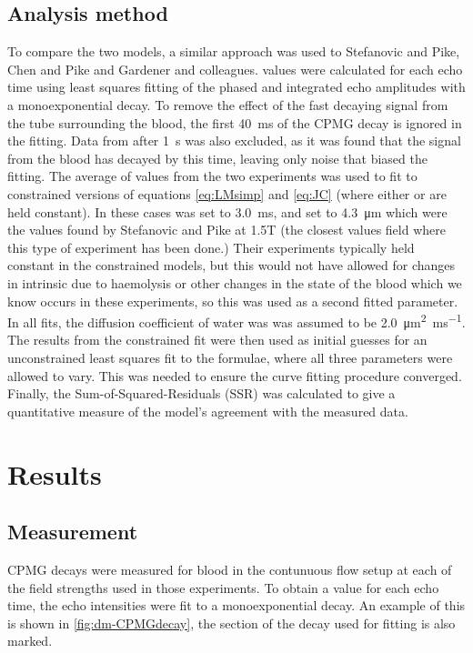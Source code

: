\subsection*{Analysis method}
To compare the two models, a similar approach was used to Stefanovic and Pike\cite{StefanovicHumanwholebloodrelaxometry2004}, Chen and Pike \cite{ChenHumanwholeblood2009} and Gardener and colleagues\cite{GardenerDependencebloodR22010}.
\Ttwo values were calculated for each echo time using least squares fitting of the phased and integrated echo amplitudes with a monoexponential decay.
To remove the effect of the fast decaying signal from the tube surrounding the blood, the first \SI{40}{ms} of the CPMG decay is ignored in the fitting.
Data from after \SI{1}{\second} was also excluded, as it was found that the signal from the blood has decayed by this time, leaving only noise that biased the fitting.
The average of \Ttwo values from the two experiments was used to fit to constrained versions of equations \ref{eq:LMsimp} and \ref{eq:JC} (where either \Texc or \rc are held constant).
In these cases \Texc was set to \SI{3.0}{ms}, and \rc set to \SI{4.3}{\micro\metre} which were the values found by Stefanovic and Pike at 1.5T\cite{StefanovicHumanwholebloodrelaxometry2004} (the closest values field where this type of experiment has been done.)
Their experiments typically held \TtwoO constant in the constrained models, but this would not have allowed for changes in intrinsic \Ttwo due to haemolysis or other changes in the state of the blood which we know occurs in these experiments, so this was used as a second fitted parameter.
In all fits, the diffusion coefficient of water was was assumed to be \SI[per-mode=reciprocal]{2.0}{\micro\metre\squared\per\milli\second}.
The results from the constrained fit were then used as initial guesses for an unconstrained least squares fit to the formulae, where all three parameters were allowed to vary.
This was needed to ensure the curve fitting procedure converged.
Finally, the Sum-of-Squared-Residuals (SSR) was calculated to give a quantitative measure of the model's agreement with the measured data.

\section{Results}

\subsection{\Ttwo Measurement}
CPMG decays were measured for blood in the contunuous flow setup at each of the field strengths used in those experiments.
To obtain a \Ttwo value for each echo time, the echo intensities were fit to a monoexponential decay.
An example of this is shown in \autoref{fig:dm-CPMGdecay}, the section of the decay used for fitting is also marked.

